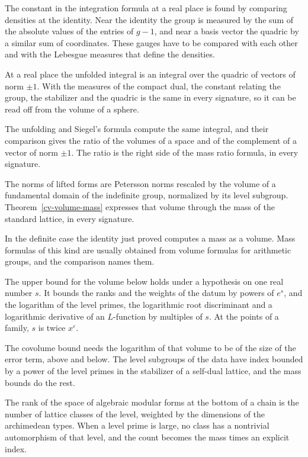 The constant in the integration formula at a real place is found by comparing densities at the
identity. Near the identity the group is measured by the sum of the absolute values of the entries of
$g-1$, and near a basis vector the quadric by a similar sum of coordinates. These gauges have to be
compared with each other and with the Lebesgue measures that define the densities.

At a real place the unfolded integral is an integral over the quadric of vectors of norm $\pm1$.
With the measures of the compact dual, the constant relating the group, the stabilizer and the
quadric is the same in every signature, so it can be read off from the volume of a sphere.

The unfolding and Siegel's formula compute the same integral, and their comparison gives the ratio
of the volumes of a space and of the complement of a vector of norm $\pm1$. The ratio is the right
side of the mass ratio formula, in every signature.

The norms of lifted forms are Petersson norms rescaled by the volume of a fundamental domain
of the indefinite group, normalized by its level subgroup. Theorem~\ref{cv-volume-mass}
expresses that volume through the mass of the standard lattice, in every signature.

In the definite case the identity just proved computes a mass as a volume. Mass formulas of this
kind are usually obtained from volume formulas for arithmetic groups, and the comparison names them.

The upper bound for the volume below holds under a hypothesis on one real number $s$. It bounds the
ranks and the weights of the datum by powers of $e^s$, and the logarithm of the level primes, the
logarithmic root discriminant and a logarithmic derivative of an $L$-function by multiples of $s$.
At the points of a family, $s$ is twice $x^\varepsilon$.

The covolume bound needs the logarithm of that volume to be of the size of the error term,
above and below. The level subgroups of the data have index bounded by a power of the level
primes in the stabilizer of a self-dual lattice, and the mass bounds do the rest.

The rank of the space of algebraic modular forms at the bottom of a chain is the number of
lattice classes of the level, weighted by the dimensions of the archimedean types. When a
level prime is large, no class has a nontrivial automorphism of that level, and the count
becomes the mass times an explicit index.


